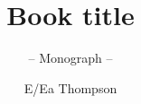 \documentclass[graybox,envcountchap,sectrefs]{style/svmono}
\begin{document}
\author{E/Ea Thompson}
\title{Book title}
\subtitle{-- Monograph --}
\maketitle

\frontmatter%






\tableofcontents




\mainmatter%




\backmatter%



\printindex

\end{document}
